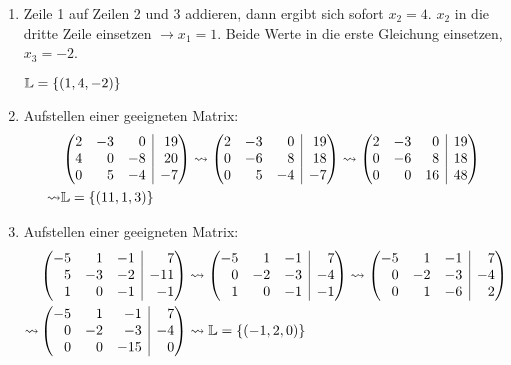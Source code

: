 \begin{lsg}{}
\begin{enumerate}
	\item Zeile 1 auf Zeilen 2 und 3 addieren, dann ergibt sich sofort $x_2=4$. $x_2$ in die dritte Zeile einsetzen $\rightarrow x_1=1$. Beide Werte in die erste Gleichung einsetzen, $x_3=-2$.

	$\mathbb{L}=\left\{ (1,4,-2) \right\}$
	\item Aufstellen einer geeigneten Matrix:
	\begin{align*}
		&\ematrix{rrr|r}{2&-3&0&19\\4&0&-8&20\\0&5&-4&-7}
		\rightsquigarrow\ematrix{rrr|r}{2&-3&0&19\\0&-6&8&18\\0&5&-4&-7}\rightsquigarrow\ematrix{rrr|r}{2&-3&0&19\\0&-6&8&18\\0&0&16&48}\\
		\rightsquigarrow&\mathbb{L}=\simpleset{(11,1,3)}
	\end{align*}

	\item Aufstellen einer geeigneten Matrix:
	\begin{align*}
		&\ematrix{rrr|r}{-5&1&-1&7\\5&-3&-2&-11\\1&0&-1&-1}
		\rightsquigarrow\ematrix{rrr|r}{-5&1&-1&7\\0&-2&-3&-4\\1&0&-1&-1}
		\rightsquigarrow\ematrix{rrr|r}{-5&1&-1&7\\0&-2&-3&-4\\0&1&-6&2}\\
		\rightsquigarrow&\ematrix{rrr|r}{-5&1&-1&7\\0&-2&-3&-4\\0&0&-15&0}
		\rightsquigarrow\mathbb{L}=\simpleset{(-1,2,0)}
	\end{align*}
\end{enumerate}
\end{lsg}





